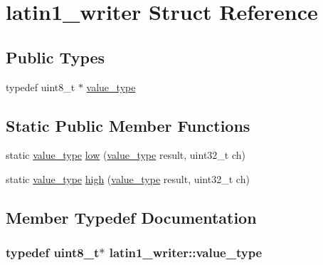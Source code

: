 \hypertarget{structlatin1__writer}{
\section{latin1\_\-writer Struct Reference}
\label{structlatin1__writer}
}
\subsection*{Public Types}
\begin{DoxyCompactItemize}
\item 
typedef uint8\_\-t $\ast$ \hyperlink{structlatin1__writer_af9228600fa7eecd793cc3d927d46eb1a}{value\_\-type}
\end{DoxyCompactItemize}
\subsection*{Static Public Member Functions}
\begin{DoxyCompactItemize}
\item 
static \hyperlink{structlatin1__writer_af9228600fa7eecd793cc3d927d46eb1a}{value\_\-type} \hyperlink{structlatin1__writer_ab5d7a833d29d66031420686ca67b1f6e}{low} (\hyperlink{structlatin1__writer_af9228600fa7eecd793cc3d927d46eb1a}{value\_\-type} result, uint32\_\-t ch)
\item 
static \hyperlink{structlatin1__writer_af9228600fa7eecd793cc3d927d46eb1a}{value\_\-type} \hyperlink{structlatin1__writer_a0e48c306ebe556f267404a9624f00554}{high} (\hyperlink{structlatin1__writer_af9228600fa7eecd793cc3d927d46eb1a}{value\_\-type} result, uint32\_\-t ch)
\end{DoxyCompactItemize}


\subsection{Member Typedef Documentation}
\hypertarget{structlatin1__writer_af9228600fa7eecd793cc3d927d46eb1a}{
\subsubsection[{value\_\-type}]{\setlength{\rightskip}{0pt plus 5cm}typedef uint8\_\-t$\ast$ {\bf latin1\_\-writer::value\_\-type}}}
\label{structlatin1__writer_af9228600fa7eecd793cc3d927d46eb1a}


